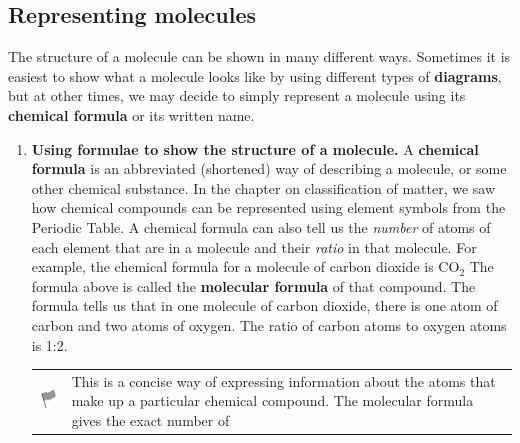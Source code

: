             \subsection{ Representing molecules}
            \nopagebreak
            
        
        \label{m38120*id307557}The structure of a molecule can be shown in many 
different ways. Sometimes it is easiest to show what a molecule looks like by 
using different types of \textbf{diagrams}, but at 
other times, we may decide to simply represent a molecule using its \textbf{chemical formula} or its written name.\par 
        \label{m38120*id307573}\begin{enumerate}[noitemsep, label=\textbf{\arabic*}. ] 
            \label{m38120*uid2}\item \textbf{Using formulae to show the structure of a 
molecule.}
A \textbf{chemical formula} is an abbreviated 
(shortened) way of describing a molecule, or some other chemical substance. In 
the chapter on classification of matter, we saw how chemical compounds can be 
represented using element symbols from the Periodic Table. A chemical formula 
can also tell us the \textsl{number} of atoms of 
each element that are in a molecule and their \textsl{ratio} in that molecule.
For example, the chemical formula for a molecule of carbon dioxide is
\begin{math}{\mathrm{CO}}_{2}\end{math}
The formula above is called the \textbf{molecular 
formula} of that compound. The formula tells us that in one molecule 
of carbon dioxide, there is one atom of carbon and two atoms of oxygen. The 
ratio of carbon atoms to oxygen atoms is 1:2.
\vspace{\rubberspace}\par
        \label{m38120*fhsst!!!underscore!!!id87}\begin{definition}
	  \begin{tabular*}{15 cm}{m{15 mm}m{}}
	\hspace*{-50pt}  \includegraphics[width=0.5in]{col11305.imgs/psflag2.png}   & \Definition{   \label{id2456697}\textbf{ Molecular formula }} { \label{m38120*meaningfhsst!!!underscore!!!id87}
This is a concise way of expressing information about the atoms that make up a 
particular chemical compound. The molecular formula gives the exact number of 
}
\end{tabular*}
\end{definition}
\end{enumerate}
